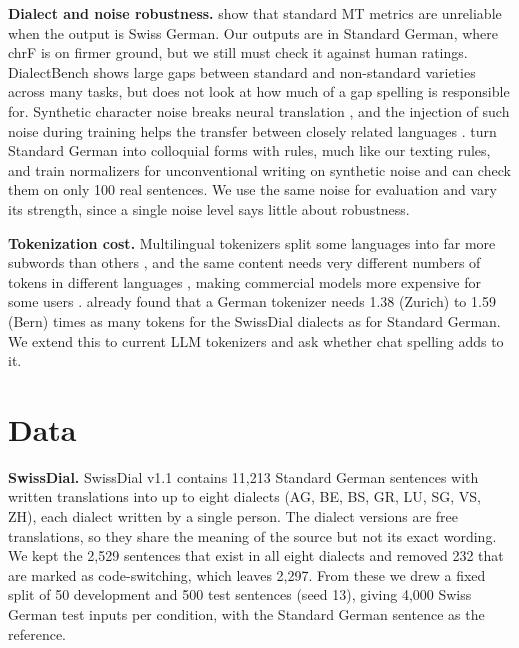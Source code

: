 \documentclass[11pt]{article}
\begin{document}
\textbf{Dialect and noise robustness.} \citet{aepli2023benchmark} show that standard MT
metrics are unreliable when the output is Swiss German. Our outputs are in Standard German, where
chrF is on firmer ground, but we still must check it against human ratings. DialectBench \citep{faisal2024dialectbench} shows large
gaps between standard and non-standard varieties across many tasks, but does not look at how much of a
gap spelling is responsible for. Synthetic character noise
breaks neural translation \citep{belinkov2018noise}, and the injection of such noise during training
helps the transfer between closely related languages \citep{aepli2022noise}. \citet{artemova2024colloquial}
turn Standard German into colloquial forms with rules, much like our texting rules, and
\citet{ahmadi2023script} train normalizers for unconventional writing on synthetic noise and can
check them on only 100 real sentences. We use the same noise
for evaluation and vary its strength, since a single noise level says little about robustness.

\textbf{Tokenization cost.} Multilingual tokenizers split some languages into far more subwords
than others \citep{rust2021tokenizer}, and the same content needs very different numbers of tokens
in different languages \citep{petrov2023unfairness}, making commercial models more expensive for
some users \citep{ahia2023cost}. \citet[App.~B]{petrov2023unfairness} already found that a German
tokenizer needs 1.38 (Zurich) to 1.59 (Bern) times as many tokens for the SwissDial dialects as for
Standard German. We extend this to current LLM tokenizers and ask whether chat spelling adds to it.

\section{Data}
\label{sec:data}

\textbf{SwissDial.} SwissDial v1.1 \citep{dogan2021swissdial} contains 11,213 Standard German
sentences with written translations into up to eight dialects (AG, BE, BS, GR, LU, SG, VS, ZH), each dialect
written by a single person. The dialect versions are free translations, so they share the meaning of
the source but not its exact wording. We kept the 2,529 sentences that exist in all eight dialects
and removed 232 that are marked as code-switching, which leaves 2,297. From these we drew a fixed
split of 50 development and 500 test sentences (seed 13), giving 4,000 Swiss German test inputs per
condition, with the Standard German sentence as the reference.
\end{document}
